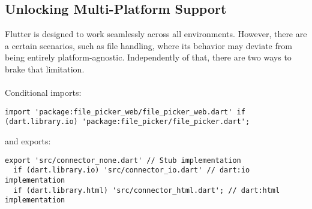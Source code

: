 
\subsection{Unlocking Multi-Platform Support}

Flutter is designed to work seamlessly across all environments. However, there are a certain scenarios, such as file
handling, where its behavior may deviate from being entirely platform-agnostic. Independently of that, there are two
ways to brake that limitation.\\
\\

\noindent Conditional imports:

\begin{lstlisting}
import 'package:file_picker_web/file_picker_web.dart' if (dart.library.io) 'package:file_picker/file_picker.dart';
\end{lstlisting}

\noindent and exports:

\begin{lstlisting}
export 'src/connector_none.dart' // Stub implementation
  if (dart.library.io) 'src/connector_io.dart' // dart:io implementation
  if (dart.library.html) 'src/connector_html.dart'; // dart:html implementation
\end{lstlisting}
